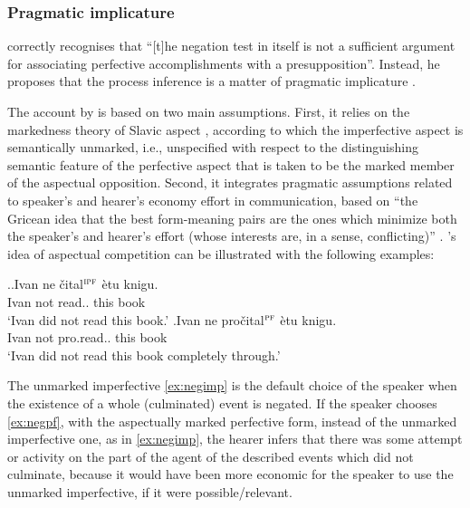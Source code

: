 \subsubsection{Pragmatic implicature}
\citet[61]{Gronn:04} correctly recognises that ``[t]he negation test in itself is not a sufficient argument for associating perfective accomplishments with a presupposition''. Instead, he proposes that the process inference is a matter of pragmatic implicature \citep{Grice:75}.

The account by \citet{Gronn:04, Gronn:06} is based on two main assumptions. First, it relies on the markedness theory of Slavic aspect \citep{Maslov:58, Jakobson:71}, according to which the imperfective aspect is semantically unmarked, i.e., unspecified with respect to the distinguishing semantic feature of the perfective
aspect that is taken to be the marked member of the aspectual opposition.
Second, it integrates pragmatic assumptions related to speaker's and hearer's economy effort in communication, based on ``the Gricean idea that the best form-meaning pairs are the ones which minimize both the speaker's and hearer's effort (whose interests are, in a sense, conflicting)'' \citep[][71]{Gronn:06}. \citeauthor{Gronn:06}'s idea of aspectual competition can be illustrated with the following examples:

\ex.\ag.\label{ex:negimp}Ivan ne \v{c}ital$^{\textsc{ipf}}$ \`{e}tu knigu.\\
Ivan not read.. this book\\
\trans `Ivan did not read this book.'
\bg.\label{ex:negpf}Ivan ne pro\v{c}ital$^{\textsc{pf}}$ \`{e}tu knigu.\\
Ivan not pro.read.. this book\\
\trans `Ivan did not read this book completely through.'\\

The unmarked imperfective \ref{ex:negimp} is the default choice of the speaker when the existence of a whole (culminated) event is negated.
If the speaker chooses \ref{ex:negpf}, with the aspectually marked perfective form, instead of the unmarked imperfective one, as in \ref{ex:negimp}, the hearer infers that there was some attempt or activity on the part of the agent of the described events which did not culminate, because it would have been more economic for the speaker to use the unmarked imperfective, if it were possible/relevant.

